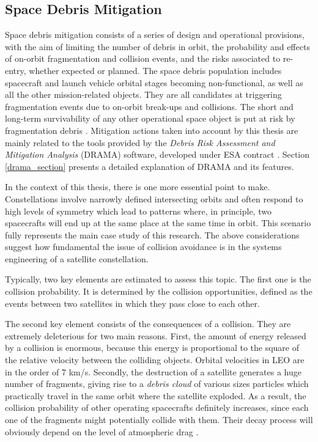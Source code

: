 \subsection{Space Debris Mitigation} \label{space_debris_mitigation}
Space debris mitigation consists of a series of design and operational provisions, with the aim of limiting the number of debris in orbit, the probability and effects of on-orbit fragmentation and collision events, and the risks associated to re-entry, whether expected or planned.
The space debris population includes spacecraft and launch vehicle orbital stages becoming non-functional, as well as all the other mission-related objects.
They are all candidates at triggering fragmentation events due to on-orbit break-ups and collisions.
The short and long-term survivability of any other operational space object is put at risk by fragmentation debris \cite{esa2023debrisguidelines}.
Mitigation actions taken into account by this thesis are mainly related to the tools provided by the \textit{Debris Risk Assessment and Mitigation Analysis} (DRAMA) software, developed under ESA contract \cite{braun2013drama}.
Section \ref{drama_section} presents a detailed explanation of DRAMA and its features. 


In the context of this thesis, there is one more essential point to make.
Constellations involve narrowly defined intersecting orbits and often respond to high levels of symmetry which lead to patterns where, in principle, two spacecrafts will end up at the same place at the same time in orbit. 
This scenario fully represents the main case study of this research.
The above considerations suggest how fundamental the issue of collision avoidance is in the systems engineering of a satellite constellation.

Typically, two key elements are estimated to assess this topic.
The first one is the collision probability.
It is determined by the collision opportunities, defined as the events between two satellites in which they pass close to each other.

The second key element consists of the consequences of a collision.
They are extremely deleterious for two main reasons.
First, the amount of energy released by a collision is enormous, because this energy is proportional to the square of the relative velocity between the colliding objects.
Orbital velocities in LEO are in the order of 7 km/s.
Secondly, the destruction of a satellite generates a huge number of fragments, giving rise to a \textit{debris cloud} of various sizes particles which practically travel in the same orbit where the satellite exploded.
As a result, the collision probability of other operating spacecrafts definitely increases, since each one of the fragments might potentially collide with them.
Their decay process will obviously depend on the level of atmospheric drag \cite{wertz2009orbit}.
